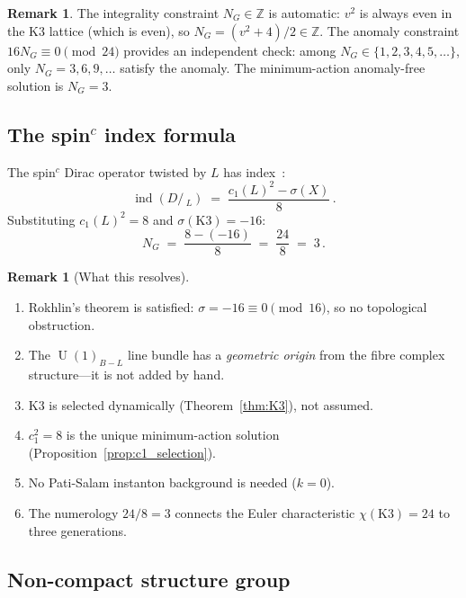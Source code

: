 \documentclass[12pt,a4paper]{article}
\theoremstyle{definition}
\newtheorem{remark}[theorem]{Remark}
\newcommand{\U}{\operatorname{U}}
\newcommand{\ind}{\operatorname{ind}}
\newcommand{\Z}{\mathbb{Z}}
\begin{document}
\begin{remark}
The integrality constraint $N_G \in \Z$ is automatic: $v^2$ is always even in the K3 lattice (which is even), so $N_G = (v^2 + 4)/2 \in \Z$.
The anomaly constraint $16 N_G \equiv 0 \pmod{24}$ provides an independent check: among $N_G \in \{1, 2, 3, 4, 5, \ldots\}$, only $N_G = 3, 6, 9, \ldots$ satisfy the anomaly.
The minimum-action anomaly-free solution is $N_G = 3$.
\end{remark}

\subsection{The \texorpdfstring{spin$^c$}{spinc} index formula}

The spin$^c$ Dirac operator twisted by $L$ has index~\cite{LawsonMichelsohn1989}:
\begin{equation}
\label{eq:spinc_index}
\ind(D\!\!\!\!/\,_{L}) \;=\; \frac{c_1(L)^2 - \sigma(X)}{8}\,.
\end{equation}
Substituting $c_1(L)^2 = 8$ and $\sigma(\mathrm{K3}) = -16$:
\begin{equation}
\boxed{N_G \;=\; \frac{8 - (-16)}{8} \;=\; \frac{24}{8} \;=\; 3\,.}
\end{equation}

\begin{remark}[What this resolves]
\begin{enumerate}[nosep]
\item Rokhlin's theorem is satisfied: $\sigma = -16 \equiv 0 \pmod{16}$, so no topological obstruction.
\item The $\U(1)_{B-L}$ line bundle has a \emph{geometric origin} from the fibre complex structure---it is not added by hand.
\item K3 is selected dynamically (Theorem~\ref{thm:K3}), not assumed.
\item $c_1^2 = 8$ is the unique minimum-action solution (Proposition~\ref{prop:c1_selection}).
\item No Pati-Salam instanton background is needed ($k = 0$).
\item The numerology $24/8 = 3$ connects the Euler characteristic $\chi(\mathrm{K3}) = 24$ to three generations.
\end{enumerate}
\end{remark}

\subsection{Non-compact structure group}
\label{sec:noncompact}
\end{document}
